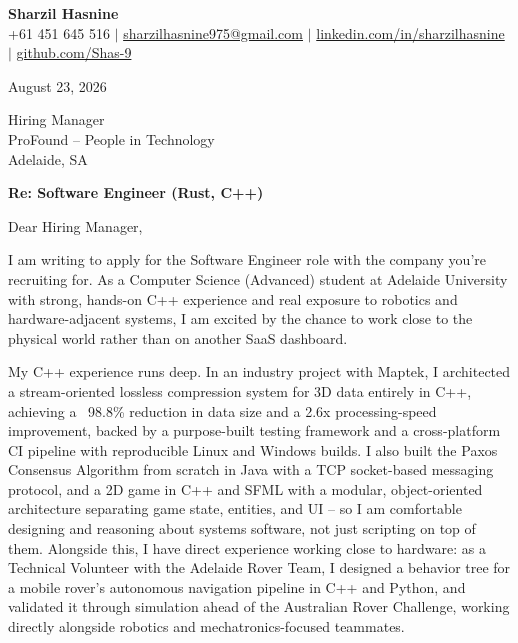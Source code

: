 \documentclass[letterpaper,11pt]{article}
\begin{document}
\begin{center}
    \textbf{\Large Sharzil Hasnine} \\ \vspace{3pt}
    \small +61 451 645 516 $|$ \href{mailto:sharzilhasnine975@gmail.com}{sharzilhasnine975@gmail.com} $|$
    \href{https://www.linkedin.com/in/sharzilhasnine/}{linkedin.com/in/sharzilhasnine} $|$
    \href{https://github.com/Shas-9}{github.com/Shas-9}
\end{center}

\vspace{10pt}

August 23, 2026

Hiring Manager \\
ProFound -- People in Technology \\
Adelaide, SA

\vspace{5pt}

\textbf{Re: Software Engineer (Rust, C++)}

Dear Hiring Manager,

I am writing to apply for the Software Engineer role with the company you're recruiting for. As a Computer Science (Advanced) student at Adelaide University with strong, hands-on C++ experience and real exposure to robotics and hardware-adjacent systems, I am excited by the chance to work close to the physical world rather than on another SaaS dashboard.

My C++ experience runs deep. In an industry project with Maptek, I architected a stream-oriented lossless compression system for 3D data entirely in C++, achieving a ~98.8\% reduction in data size and a 2.6x processing-speed improvement, backed by a purpose-built testing framework and a cross-platform CI pipeline with reproducible Linux and Windows builds. I also built the Paxos Consensus Algorithm from scratch in Java with a TCP socket-based messaging protocol, and a 2D game in C++ and SFML with a modular, object-oriented architecture separating game state, entities, and UI -- so I am comfortable designing and reasoning about systems software, not just scripting on top of them. Alongside this, I have direct experience working close to hardware: as a Technical Volunteer with the Adelaide Rover Team, I designed a behavior tree for a mobile rover's autonomous navigation pipeline in C++ and Python, and validated it through simulation ahead of the Australian Rover Challenge, working directly alongside robotics and mechatronics-focused teammates.
\end{document}
